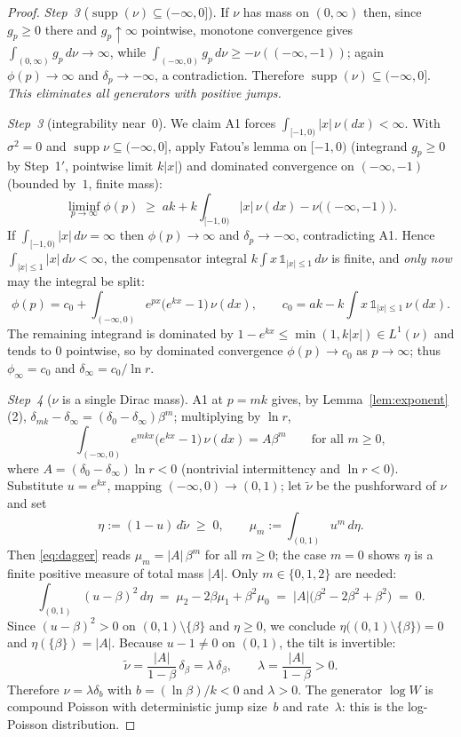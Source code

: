 \documentclass[12pt]{amsart}
\theoremstyle{definition}
\theoremstyle{remark}
\DeclareMathOperator{\supp}{supp}
\begin{document}
\begin{proof}
\textit{Step~3} ($\supp(\nu) \subseteq (-\infty,0]$).  If $\nu$ has
mass on $(0,\infty)$ then, since $g_p \ge 0$ there and $g_p \uparrow
\infty$ pointwise, monotone convergence gives $\int_{(0,\infty)}
g_p\,d\nu \to \infty$, while $\int_{(-\infty,0)} g_p\,d\nu \ge
-\nu((-\infty,-1))$; again $\phi(p) \to \infty$ and $\delta_p \to
-\infty$, a contradiction.  Therefore $\supp(\nu) \subseteq
(-\infty,0]$.  \textit{This eliminates all generators with positive
jumps.}

\textit{Step~3\textonehalf} (integrability near~$0$).  We claim A1
forces $\int_{[-1,0)} |x|\,\nu(dx) < \infty$.  With $\sigma^2 = 0$
and $\supp\nu \subseteq (-\infty,0]$, apply Fatou's lemma on
$[-1,0)$ (integrand $g_p \ge 0$ by Step~1$'$, pointwise limit
$k|x|$) and dominated convergence on $(-\infty,-1)$ (bounded by~$1$,
finite mass):
\[
  \liminf_{p\to\infty} \phi(p)
  \;\ge\; ak + k\int_{[-1,0)} |x|\,\nu(dx)
  - \nu\bigl((-\infty,-1)\bigr).
\]
If $\int_{[-1,0)}|x|\,d\nu = \infty$ then $\phi(p) \to \infty$ and
$\delta_p \to -\infty$, contradicting A1.  Hence
$\int_{|x|\le1}|x|\,d\nu < \infty$, the compensator integral
$k\int x\,\mathds{1}_{|x|\le1}\,d\nu$ is finite, and \emph{only now}
may the integral be split:
\[
  \phi(p) = c_0 + \int_{(-\infty,0)} e^{px}\bigl(e^{kx}-1\bigr)
  \,\nu(dx),
  \qquad
  c_0 = ak - k\!\int x\,\mathds{1}_{|x|\leq 1}\,\nu(dx).
\]
The remaining integrand is dominated by $1 - e^{kx} \le
\min(1, k|x|) \in L^1(\nu)$ and tends to $0$ pointwise, so by
dominated convergence $\phi(p) \to c_0$ as $p \to \infty$; thus
$\phi_\infty = c_0$ and $\delta_\infty = c_0/\ln r$.

\textit{Step~4} ($\nu$ is a single Dirac mass).  A1 at $p = mk$
gives, by Lemma~\ref{lem:exponent}(2),
$\delta_{mk} - \delta_\infty = (\delta_0-\delta_\infty)\beta^m$;
multiplying by $\ln r$,
\begin{equation}\label{eq:dagger}
  \int_{(-\infty,0)} e^{mkx}\bigl(e^{kx}-1\bigr)\,\nu(dx)
  = A\beta^m
  \qquad\text{for all } m \geq 0,
\end{equation}
where $A = (\delta_0 - \delta_\infty)\ln r < 0$ (nontrivial
intermittency and $\ln r < 0$).  Substitute $u = e^{kx}$, mapping
$(-\infty,0) \to (0,1)$; let $\tilde\nu$ be the pushforward of $\nu$
and set
\[
  \eta := (1-u)\,d\tilde\nu \;\ge\; 0,
  \qquad
  \mu_m := \int_{(0,1)} u^m \, d\eta .
\]
Then \eqref{eq:dagger} reads $\mu_m = |A|\,\beta^m$ for all $m \ge
0$; the case $m=0$ shows $\eta$ is a finite positive measure of
total mass $|A|$.  Only $m \in \{0,1,2\}$ are needed:
\[
  \int_{(0,1)} (u-\beta)^2 \, d\eta
  \;=\; \mu_2 - 2\beta\mu_1 + \beta^2\mu_0
  \;=\; |A|\bigl(\beta^2 - 2\beta^2 + \beta^2\bigr)
  \;=\; 0 .
\]
Since $(u-\beta)^2 > 0$ on $(0,1)\setminus\{\beta\}$ and $\eta \ge
0$, we conclude $\eta\bigl((0,1)\setminus\{\beta\}\bigr) = 0$ and
$\eta(\{\beta\}) = |A|$.  Because $u - 1 \neq 0$ on $(0,1)$, the
tilt is invertible:
\[
  \tilde\nu = \frac{|A|}{1-\beta}\,\delta_\beta
  = \lambda\,\delta_\beta,
  \qquad \lambda = \frac{|A|}{1-\beta} > 0 .
\]
Therefore $\nu = \lambda\delta_b$ with $b = (\ln\beta)/k < 0$ and
$\lambda > 0$.  The generator $\log W$ is compound Poisson with
deterministic jump size~$b$ and rate~$\lambda$: this is the
log-Poisson distribution.
\end{proof}
\end{document}
